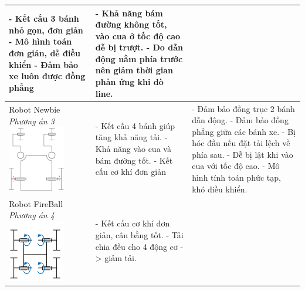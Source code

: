 \begin{longtable}{|p{4cm}|p{5cm}|p{5cm}|}
                - Kết cấu 3 bánh nhỏ gọn, đơn giản \newline
                - Mô hình toán đơn giản, dễ điều khiển \newline
                - Đảm bảo xe luôn được đồng phẳng & 
                - Khả năng bám đường không tốt, vào cua ở tốc độ cao dễ bị trượt. \newline
                - Do dẫn động nằm phía trước nên giảm thời gian phản ứng khi dò line. \\
                \hline
                Robot Newbie \newline
                \textit{Phương án 3} \newline
                \includegraphics[width=2.5cm]{pictures/chapter2/chapter2_pic_3.png} & 
                - Kết cấu 4 bánh giúp tăng khả năng tải. \newline
                - Khả năng vào cua và bám đường tốt. \newline
                - Kết cấu cơ khí đơn giản & 
                - Đảm bảo đồng trục 2 bánh dẫn động. \newline
                - Đảm bảo đồng phẳng giữa các bánh xe. \newline
                - Bị hóc đầu nếu đặt tải lệch về phía sau. \newline
                - Dễ bị lật khi vào cua với tốc độ cao. \newline
                - Mô hình tính toán phức tạp, khó điều khiển. \\
                \hline
                Robot FireBall \newline
                \textit{Phương án 4} \newline
                \includegraphics[width=2.5cm]{pictures/chapter2/chapter2_pic_4.png} &
                - Kết cấu cơ khí đơn giản, cân bằng tốt. \newline
                - Tải chia đều cho 4 động cơ -> giảm tải. \newline

\end{longtable}
